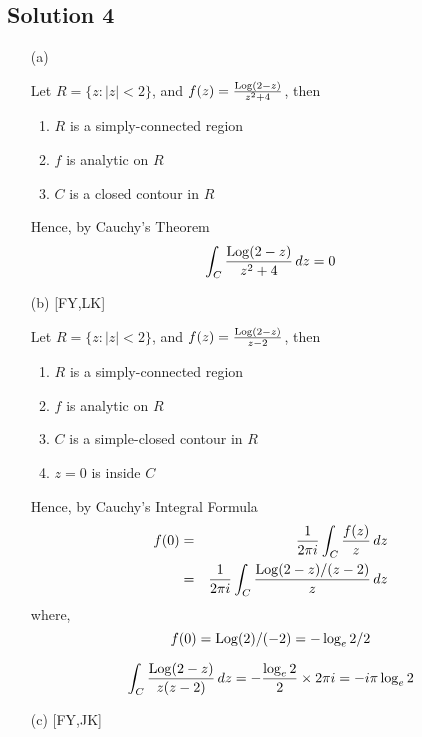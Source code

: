 \subsection*{Solution 4}

\begin{itemize}
\item[(a)]

Let $R=\{ z: |z|<2 \}$, and $f(z)=\frac{{\rm Log}(2-z)}{z^2+4}$, then
\begin{enumerate}
\item $R$ is a simply-connected region
\item $f$ is analytic on $R$
\item $C$ is a closed contour in $R$
\end{enumerate}
Hence, by Cauchy's Theorem
\[
\int_C \frac{{\rm Log}(2-z)}{z^2+4}\,dz = 0
\]

\item[(b)][FY,LK]

Let $R=\{ z: |z|<2 \}$, and $f(z)=\frac{{\rm Log}(2-z)}{z-2}$, then
\begin{enumerate}
\item $R$ is a simply-connected region
\item $f$ is analytic on $R$
\item $C$ is a simple-closed contour in $R$
\item $z=0$ is inside $C$
\end{enumerate}
Hence, by Cauchy's Integral Formula 
\begin{eqnarray*}
f(0)	&=& \frac{1}{2\pi i} \int_C \frac{f(z)}{z}\, dz \\
	&=& \frac{1}{2\pi i} \int_C \frac{{\rm Log}(2-z)/(z-2)}{z}\, dz \\
\end{eqnarray*}
where,
\[ f(0) = {\rm Log}(2)/(-2) = -\log_e 2/2 \]

\[
\int_C \frac{{\rm Log}(2-z)}{z(z-2)}\,dz = -\frac{\log_e 2}{2}\times2\pi i = -i\pi\log_e 2
\]

\item[(c)][FY,JK]


\end{itemize}
